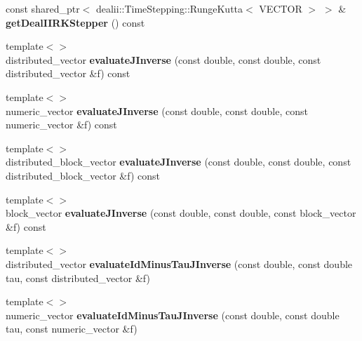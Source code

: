 \begin{DoxyCompactItemize}
\item 
\hypertarget{classnatrium_1_1DealIIWrapper_ad5a2afa2b03697767272036a6acd51ff}{
const shared\_\-ptr$<$ dealii::TimeStepping::RungeKutta$<$ VECTOR $>$ $>$ \& {\bfseries getDealIIRKStepper} () const }
\label{classnatrium_1_1DealIIWrapper_ad5a2afa2b03697767272036a6acd51ff}

\item 
\hypertarget{classnatrium_1_1DealIIWrapper_ad9f669169c770a15fc9edf5e93030b1f}{
{\footnotesize template$<$$>$ }\\distributed\_\-vector {\bfseries evaluateJInverse} (const double, const double, const distributed\_\-vector \&f) const}
\label{classnatrium_1_1DealIIWrapper_ad9f669169c770a15fc9edf5e93030b1f}

\item 
\hypertarget{classnatrium_1_1DealIIWrapper_a83a7d57a68f35158263bf74c0a4d5aed}{
{\footnotesize template$<$$>$ }\\numeric\_\-vector {\bfseries evaluateJInverse} (const double, const double, const numeric\_\-vector \&f) const}
\label{classnatrium_1_1DealIIWrapper_a83a7d57a68f35158263bf74c0a4d5aed}

\item 
\hypertarget{classnatrium_1_1DealIIWrapper_a43b19df161e01db3b99489877eaf6451}{
{\footnotesize template$<$$>$ }\\distributed\_\-block\_\-vector {\bfseries evaluateJInverse} (const double, const double, const distributed\_\-block\_\-vector \&f) const}
\label{classnatrium_1_1DealIIWrapper_a43b19df161e01db3b99489877eaf6451}

\item 
\hypertarget{classnatrium_1_1DealIIWrapper_a389c33cc682c761e63adb08fd4f68031}{
{\footnotesize template$<$$>$ }\\block\_\-vector {\bfseries evaluateJInverse} (const double, const double, const block\_\-vector \&f) const}
\label{classnatrium_1_1DealIIWrapper_a389c33cc682c761e63adb08fd4f68031}

\item 
\hypertarget{classnatrium_1_1DealIIWrapper_ab0e57073c150e04e063dc621bf9b94f5}{
{\footnotesize template$<$$>$ }\\distributed\_\-vector {\bfseries evaluateIdMinusTauJInverse} (const double, const double tau, const distributed\_\-vector \&f)}
\label{classnatrium_1_1DealIIWrapper_ab0e57073c150e04e063dc621bf9b94f5}

\item 
\hypertarget{classnatrium_1_1DealIIWrapper_a9a50370a5fbdce709aab87a4c38d5247}{
{\footnotesize template$<$$>$ }\\numeric\_\-vector {\bfseries evaluateIdMinusTauJInverse} (const double, const double tau, const numeric\_\-vector \&f)}
\label{classnatrium_1_1DealIIWrapper_a9a50370a5fbdce709aab87a4c38d5247}


\end{DoxyCompactItemize}
